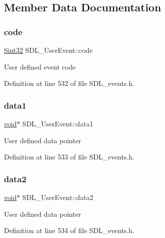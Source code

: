 \subsection{Member Data Documentation}
\mbox{\label{struct_s_d_l___user_event_aef47976781ee82b527a353c5acfa0a34}} 
\subsubsection{\texorpdfstring{code}{code}}
{\footnotesize\ttfamily \mbox{\hyperlink{_s_d_l__stdinc_8h_a7a90b941db9d4582e9ad7abb9940ff7e}{Sint32}} S\+D\+L\+\_\+\+User\+Event\+::code}

User defined event code 

Definition at line 532 of file S\+D\+L\+\_\+events.\+h.

\mbox{\label{struct_s_d_l___user_event_ab2893a12be2f97195f16463a23107913}} 
\subsubsection{\texorpdfstring{data1}{data1}}
{\footnotesize\ttfamily \mbox{\hyperlink{_s_d_l__opengles2__gl2ext_8h_ae5d8fa23ad07c48bb609509eae494c95}{void}}$\ast$ S\+D\+L\+\_\+\+User\+Event\+::data1}

User defined data pointer 

Definition at line 533 of file S\+D\+L\+\_\+events.\+h.

\mbox{\label{struct_s_d_l___user_event_aae4dbf65c34d654c9edf519eb061b7cf}} 
\subsubsection{\texorpdfstring{data2}{data2}}
{\footnotesize\ttfamily \mbox{\hyperlink{_s_d_l__opengles2__gl2ext_8h_ae5d8fa23ad07c48bb609509eae494c95}{void}}$\ast$ S\+D\+L\+\_\+\+User\+Event\+::data2}

User defined data pointer 

Definition at line 534 of file S\+D\+L\+\_\+events.\+h.

